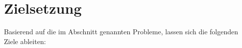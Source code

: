 

\section{Zielsetzung}\label{sec:zielsetzung}

Basierend auf die im Abschnitt  genannten Probleme, lassen sich die folgenden Ziele ableiten:

